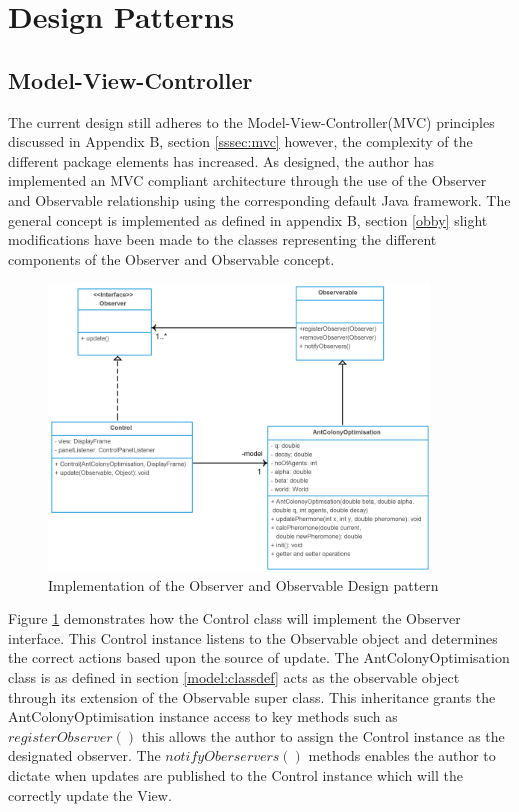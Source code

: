\section{Design Patterns}
\subsection{Model-View-Controller}
The current design still adheres to the Model-View-Controller(MVC) principles discussed in Appendix B, section \ref{sssec:mvc} however, the complexity of the different package elements has increased. As designed, the author has implemented an MVC compliant architecture through the use of the Observer and Observable relationship using the corresponding default Java framework. The general concept is implemented as defined in appendix B, section \ref{obby} slight modifications have been made to the classes representing the different components of the Observer and Observable concept.

\begin{figure}[H]
\centering
\includegraphics[width=0.9\textwidth]{Images/chapter4/observerImplemetation}
\caption[Observer and Observable Implementation]{Implementation of the Observer and Observable Design pattern}
\label{fig:observableImp}
\end{figure}

Figure \ref{fig:observableImp} demonstrates how the Control class will implement the Observer interface. This Control instance listens to the Observable object and determines the correct actions based upon the source of update. The AntColonyOptimisation class is as defined in section \ref{model:classdef} acts as the observable object through its extension of the Observable super class. This inheritance grants the AntColonyOptimisation instance access to key methods such as $registerObserver()$ this allows the author to assign the Control instance as the designated observer. The $notifyOberservers()$ methods enables the author to dictate when updates are published to the Control instance which will the correctly update the View.

